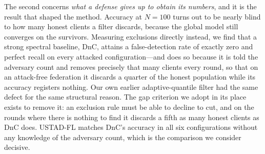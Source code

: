 \documentclass[journal]{IEEEtran}
\begin{document}
The second concerns \emph{what a defense gives up to obtain its numbers}, and it is the result that shaped the method. Accuracy at $N=100$ turns out to be nearly blind to how many honest clients a filter discards, because the global model still converges on the survivors. Measuring exclusions directly instead, we find that a strong spectral baseline, DnC, attains a false-detection rate of exactly zero and perfect recall on every attacked configuration---and does so because it is told the adversary count and removes precisely that many clients every round, so that on an attack-free federation it discards a quarter of the honest population while its accuracy registers nothing. Our own earlier adaptive-quantile filter had the same defect for the same structural reason. The gap criterion we adopt in its place exists to remove it: an exclusion rule must be able to decline to cut, and on the rounds where there is nothing to find it discards a fifth as many honest clients as DnC does. USTAD-FL matches DnC's accuracy in all six configurations without any knowledge of the adversary count, which is the comparison we consider decisive.
\end{document}
